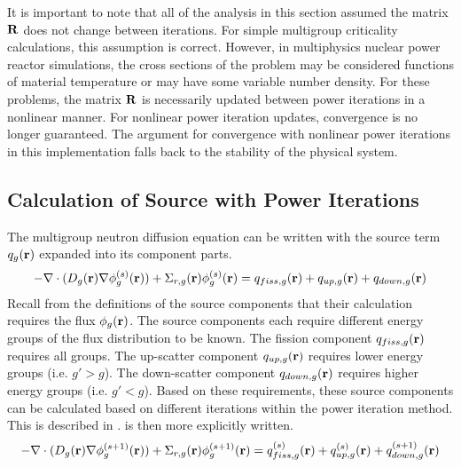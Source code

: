     It is important to note that all of the analysis in this section assumed the
    matrix $\mathbf{R}$ does not change between iterations. For simple multigroup
    criticality calculations, this assumption is correct. However, in
    multiphysics nuclear power reactor simulations, the cross sections of the 
    problem may be considered functions of material temperature or may have some
    variable number density. For these problems, the matrix $\mathbf{R}$ is necessarily
    updated between power iterations in a nonlinear manner. For nonlinear power
    iteration updates, convergence is no longer guaranteed. The argument for
    convergence with nonlinear power iterations in this implementation falls
    back to the stability of the physical system.
    
  \subsection{Calculation of Source with Power Iterations}
  \label{sec:calculation_of_source_with_power_iterations}
    The multigroup neutron diffusion equation  can be
    written with the source term $q_g(\mathbf{r})$ expanded into its component parts.
    \begin{equation} \label{eq:multigroup_source_expand}
      -\mathbf{\nabla} \cdot (D_g(\mathbf{r}) \mathbf{\nabla} \phi_g^{(s)}(\mathbf{r})) + \Sigma_{r,g}(\mathbf{r})
      \phi_g^{(s)}(\mathbf{r}) = q_{fiss,g}(\mathbf{r}) + q_{up,g}(\mathbf{r}) + q_{down,g}(\mathbf{r})
    \end{equation}
    Recall from the definitions of the source components that their calculation
    requires the flux $\phi_g(\mathbf{r})$. The source components each require
    different energy groups of the flux distribution to be known. The fission
    component $q_{fiss,g}(\mathbf{r})$ requires all groups. The up-scatter component
    $q_{up,g}(\mathbf{r})$ requires lower energy groups (i.e. $g' > g$). The
    down-scatter component $q_{down,g}(\mathbf{r})$ requires higher energy groups (i.e.
    $g' < g$). Based on these requirements, these source components can be
    calculated based on different iterations within the power iteration method.
    This is described in .
     is then more explicitly written.
    \begin{equation} 
      \label{eq:multigroup_power_iterations}
      -\mathbf{\nabla} \cdot (D_g(\mathbf{r}) \mathbf{\nabla} \phi_g^{(s+1)}(\mathbf{r})) + \Sigma_{r,g}(\mathbf{r})
      \phi_g^{(s+1)}(\mathbf{r}) = q_{fiss,g}^{(s)}(\mathbf{r}) + q_{up,g}^{(s)}(\mathbf{r}) +
      q_{down,g}^{(s+1)}(\mathbf{r})
    \end{equation}


